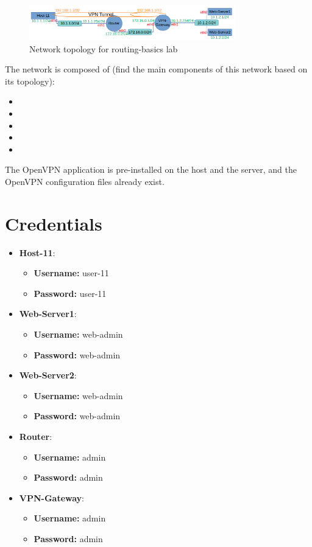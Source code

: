 \begin{figure}[H]
\begin{center}
\includegraphics [width=0.8\textwidth]{labtainers-vpn2-lab-01.png}
\end{center}
\caption{Network topology for routing-basics lab}
\label{fig:topology}
\end{figure}

The network is composed of (find the main components of this network based on its topology):
\begin{itemize}
	\item
	\item
	\item
	\item
	\item
\end{itemize}

The OpenVPN application is pre-installed on the host and the server, and the OpenVPN configuration files already exist.

\section{Credentials}
\begin{itemize}
	\item \textbf{Host-11}:
	\begin{itemize}
		\item \textbf{Username:} user-11
		\item \textbf{Password:} user-11
	\end{itemize}
	\item \textbf{Web-Server1}:
	\begin{itemize}
		\item \textbf{Username:} web-admin
		\item \textbf{Password:} web-admin
	\end{itemize}
	\item \textbf{Web-Server2}:
	\begin{itemize}
		\item \textbf{Username:} web-admin
		\item \textbf{Password:} web-admin
	\end{itemize}
	\item \textbf{Router}:
	\begin{itemize}
		\item \textbf{Username:} admin
		\item \textbf{Password:} admin
	\end{itemize}
	\item \textbf{VPN-Gateway}:
	\begin{itemize}
		\item \textbf{Username:} admin
		\item \textbf{Password:} admin
	\end{itemize}
\end{itemize}

